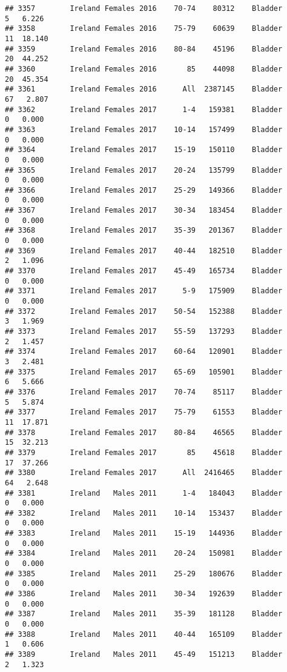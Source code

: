 \documentclass[
]{article}
\begin{document}
\begin{verbatim}
## 3357        Ireland Females 2016    70-74    80312    Bladder      5   6.226
## 3358        Ireland Females 2016    75-79    60639    Bladder     11  18.140
## 3359        Ireland Females 2016    80-84    45196    Bladder     20  44.252
## 3360        Ireland Females 2016       85    44098    Bladder     20  45.354
## 3361        Ireland Females 2016      All  2387145    Bladder     67   2.807
## 3362        Ireland Females 2017      1-4   159381    Bladder      0   0.000
## 3363        Ireland Females 2017    10-14   157499    Bladder      0   0.000
## 3364        Ireland Females 2017    15-19   150110    Bladder      0   0.000
## 3365        Ireland Females 2017    20-24   135799    Bladder      0   0.000
## 3366        Ireland Females 2017    25-29   149366    Bladder      0   0.000
## 3367        Ireland Females 2017    30-34   183454    Bladder      0   0.000
## 3368        Ireland Females 2017    35-39   201367    Bladder      0   0.000
## 3369        Ireland Females 2017    40-44   182510    Bladder      2   1.096
## 3370        Ireland Females 2017    45-49   165734    Bladder      0   0.000
## 3371        Ireland Females 2017      5-9   175909    Bladder      0   0.000
## 3372        Ireland Females 2017    50-54   152388    Bladder      3   1.969
## 3373        Ireland Females 2017    55-59   137293    Bladder      2   1.457
## 3374        Ireland Females 2017    60-64   120901    Bladder      3   2.481
## 3375        Ireland Females 2017    65-69   105901    Bladder      6   5.666
## 3376        Ireland Females 2017    70-74    85117    Bladder      5   5.874
## 3377        Ireland Females 2017    75-79    61553    Bladder     11  17.871
## 3378        Ireland Females 2017    80-84    46565    Bladder     15  32.213
## 3379        Ireland Females 2017       85    45618    Bladder     17  37.266
## 3380        Ireland Females 2017      All  2416465    Bladder     64   2.648
## 3381        Ireland   Males 2011      1-4   184043    Bladder      0   0.000
## 3382        Ireland   Males 2011    10-14   153437    Bladder      0   0.000
## 3383        Ireland   Males 2011    15-19   144936    Bladder      0   0.000
## 3384        Ireland   Males 2011    20-24   150981    Bladder      0   0.000
## 3385        Ireland   Males 2011    25-29   180676    Bladder      0   0.000
## 3386        Ireland   Males 2011    30-34   192639    Bladder      0   0.000
## 3387        Ireland   Males 2011    35-39   181128    Bladder      0   0.000
## 3388        Ireland   Males 2011    40-44   165109    Bladder      1   0.606
## 3389        Ireland   Males 2011    45-49   151213    Bladder      2   1.323

\end{verbatim}
\end{document}
